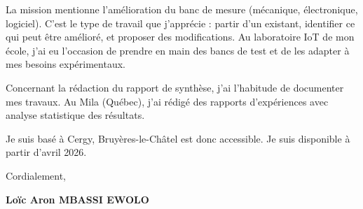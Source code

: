 \documentclass[a4paper,11pt]{article}
\begin{document}
\vspace{0.25cm}

La mission mentionne l'amélioration du banc de mesure (mécanique, électronique, logiciel). C'est le type de travail que j'apprécie : partir d'un existant, identifier ce qui peut être amélioré, et proposer des modifications. Au laboratoire IoT de mon école, j'ai eu l'occasion de prendre en main des bancs de test et de les adapter à mes besoins expérimentaux.

\vspace{0.25cm}

Concernant la rédaction du rapport de synthèse, j'ai l'habitude de documenter mes travaux. Au Mila (Québec), j'ai rédigé des rapports d'expériences avec analyse statistique des résultats.

\vspace{0.25cm}

Je suis basé à Cergy, Bruyères-le-Châtel est donc accessible. Je suis disponible à partir d'avril 2026.

\vspace{0.4cm}

Cordialement,

\vspace{0.8cm}

\textbf{Loïc Aron MBASSI EWOLO}
\end{document}

